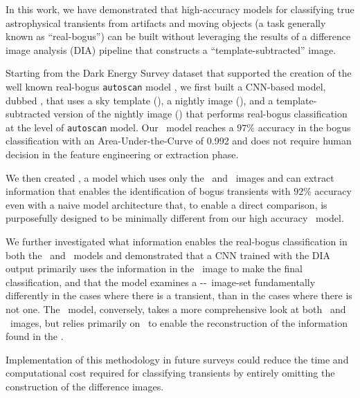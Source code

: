 

In this work, we have demonstrated that high-accuracy models for classifying true astrophysical transients from artifacts and moving objects (a task generally known as ``real-bogus'') can be built without leveraging the results of a difference image analysis (DIA) pipeline that constructs a ``template-subtracted'' image.

Starting from the Dark Energy Survey dataset that supported the creation of the well known real-bogus \texttt{autoscan} model \citep{Goldstein_2015}, we first built a CNN-based model, dubbed \diabased, that uses a sky template (\temp), a nightly image (\search), and a template-subtracted version of the nightly image (\diff) that performs real-bogus classification at the level of \texttt{autoscan} model.
Our \diabased\ model reaches a $97\%$ accuracy in the bogus classification with an Area-Under-the-Curve of 0.992 and does not require human decision in the feature engineering or extraction phase.

We then created \nodia, a model which uses only the \temp\ and \search\ images and can extract information that enables the identification of bogus transients with $92\%$ accuracy even with a naive model architecture that, to enable a direct comparison, is purposefully designed to be minimally different from our high accuracy \diabased\ model.

We further investigated what information enables the real-bogus classification in both the \diabased\ and \nodia\ models and demonstrated that a CNN trained with the DIA output primarily uses the information in the \diff\ image to make the final classification, and that the model examines a \diff-\search-\temp\ image-set fundamentally differently in the cases where there is a transient, than in the cases where there is not one. The \nodia\ model, conversely, takes a more comprehensive look at both \temp\ and \search\ images, but relies primarily on \temp\ to enable the reconstruction of the information found in the \diff.

Implementation of this methodology in future surveys could reduce the time and computational cost required for classifying transients by entirely omitting the construction of the difference images.  